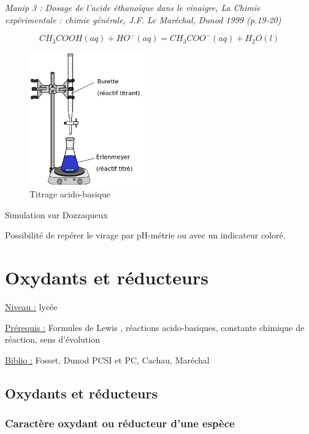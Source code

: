 \documentclass{article}%
\begin{document}
\textit{Manip 3 : Dosage de l’acide éthanoïque dans le vinaigre, La Chimie expérimentale : chimie générale, J.F. Le Maréchal, Dunod 1999 (p.19-20)}

\[CH_3COOH(aq) + HO^-(aq) = CH_3COO^-(aq) +H_2O(l)\]

\begin{figure}
	\centerline{\includegraphics[width=5cm]{images/Acid-base-titration-fr.png}}
	\caption{Titrage acido-basique}
\end{figure}

Simulation sur Dozzaqueux

Possibilité de repérer le virage par pH-métrie ou avec un indicateur coloré.


\section{Oxydants et réducteurs}
\underline{Niveau :} lycée

\underline{Prérequis :} Formules de Lewis , réactions acido-basiques, constante chimique de réaction, sens d'évolution

\underline{Biblio :} Fosset, Dunod PCSI et PC, Cachau, Maréchal

\subsection{Oxydants et réducteurs}
\subsubsection{Caractère oxydant ou réducteur d'une espèce}

\end{document}
